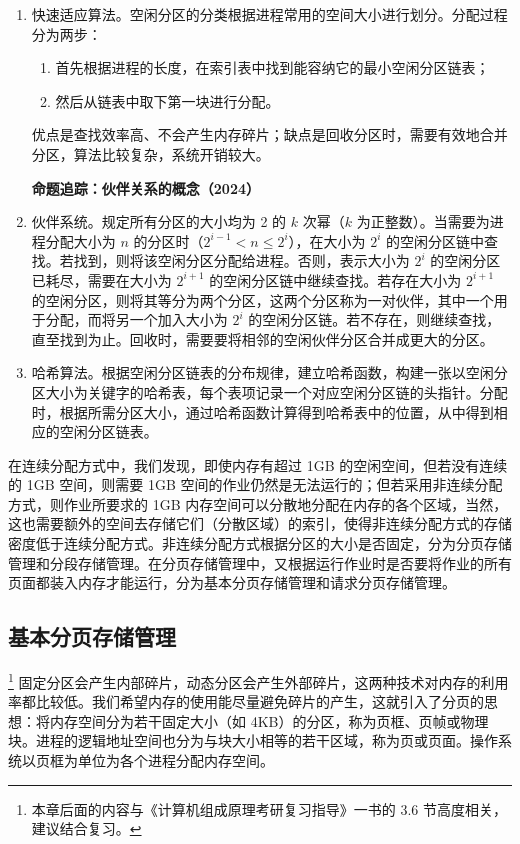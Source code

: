 \documentclass{ctexbook}
\begin{document}
	\begin{enumerate}
	\item 快速适应算法。空闲分区的分类根据进程常用的空间大小进行划分。分配过程分为两步：
	\begin{enumerate}
		\item 首先根据进程的长度，在索引表中找到能容纳它的最小空闲分区链表；
		\item 然后从链表中取下第一块进行分配。 
	\end{enumerate}
	优点是查找效率高、不会产生内存碎片；缺点是回收分区时，需要有效地合并分区，算法比较复杂，系统开销较大。
	
	\textbf{命题追踪：伙伴关系的概念（2024）}
	
	\item 伙伴系统。规定所有分区的大小均为 2 的 \( k \) 次幂（\( k \) 为正整数）。当需要为进程分配大小为 \( n \) 的分区时（\( 2^{i - 1} < n \leq 2^i \)），在大小为 \( 2^i \) 的空闲分区链中查找。若找到，则将该空闲分区分配给进程。否则，表示大小为 \( 2^i \) 的空闲分区已耗尽，需要在大小为 \( 2^{i + 1} \) 的空闲分区链中继续查找。若存在大小为 \( 2^{i + 1} \) 的空闲分区，则将其等分为两个分区，这两个分区称为一对伙伴，其中一个用于分配，而将另一个加入大小为 \( 2^i \) 的空闲分区链。若不存在，则继续查找，直至找到为止。回收时，需要要将相邻的空闲伙伴分区合并成更大的分区。
	
	\item 哈希算法。根据空闲分区链表的分布规律，建立哈希函数，构建一张以空闲分区大小为关键字的哈希表，每个表项记录一个对应空闲分区链的头指针。分配时，根据所需分区大小，通过哈希函数计算得到哈希表中的位置，从中得到相应的空闲分区链表。
	\end{enumerate}
	
	在连续分配方式中，我们发现，即使内存有超过 1GB 的空闲空间，但若没有连续的 1GB 空间，则需要 1GB 空间的作业仍然是无法运行的；但若采用非连续分配方式，则作业所要求的 1GB 内存空间可以分散地分配在内存的各个区域，当然，这也需要额外的空间去存储它们（分散区域）的索引，使得非连续分配方式的存储密度低于连续分配方式。非连续分配方式根据分区的大小是否固定，分为分页存储管理和分段存储管理。在分页存储管理中，又根据运行作业时是否要将作业的所有页面都装入内存才能运行，分为基本分页存储管理和请求分页存储管理。
	
	\subsection{基本分页存储管理}\footnote{本章后面的内容与《计算机组成原理考研复习指导》一书的 3.6 节高度相关，建议结合复习。}
	固定分区会产生内部碎片，动态分区会产生外部碎片，这两种技术对内存的利用率都比较低。我们希望内存的使用能尽量避免碎片的产生，这就引入了分页的思想：将内存空间分为若干固定大小（如 4KB）的分区，称为页框、页帧或物理块。进程的逻辑地址空间也分为与块大小相等的若干区域，称为页或页面。操作系统以页框为单位为各个进程分配内存空间。
	
\end{document}

